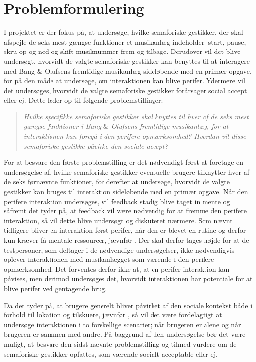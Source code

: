 \section{Problemformulering}
\label{Problemformulering}
%
I projektet er der fokus på, at undersøge, hvilke semaforiske gestikker, der skal afspejle de seks mest gængse funktioner et musikanlæg indeholder; start, pause, skru op og ned og skift musiknummer frem og tilbage. Derudover vil det blive undersøgt, hvorvidt de valgte semaforiske gestikker kan benyttes til at interagere med Bang $\&$ Olufsens fremtidige musikanlæg sideløbende med en primær opgave, for på den måde at undersøge, om interaktionen kan blive perifer. Ydermere vil det undersøges, hvorvidt de valgte semaforiske gestikker forårsager social accept eller ej. Dette leder op til følgende problemstillinger:\blankline
%
\begin{quotation}
	\noindent
	\textit{Hvilke specifikke semaforiske gestikker skal knyttes til hver af de seks mest gængse funktioner i Bang $\&$ Olufsens fremtidige musikanlæg, for at interaktionen kan foregå i den perifere opmærksomhed?\blankline
		Hvordan vil disse semaforiske gestikke påvirke den sociale accept?}\blankline
\end{quotation}
%
For at besvare den første problemstilling er det nødvendigt først at foretage en undersøgelse af, hvilke semaforiske gestikker eventuelle brugere tilknytter hver af de seks førnævnte funktioner, for derefter at undersøge, hvorvidt de valgte gestikker kan bruges til interaktion sideløbende med en primær opgave. Når den perifere interaktion undersøges, vil feedback stadig blive taget in mente og såfremt det tyder på, at feedback vil være nødvendig for at fremme den perifere interaktion, så vil dette blive undersøgt og diskuteret nærmere. Som nævnt tidligere bliver en interaktion først perifer, når den er blevet en rutine og derfor kun kræver få mentale ressourcer, jævnfør . Der skal derfor tages højde for at de testpersoner, som deltager i de nødvendige undersøgelser, ikke nødvendigvis oplever interaktionen med musikanlægget som værende i den perifere opmærksomhed. Det forventes derfor ikke at, at en perifer interaktion kan påvises, men derimod undersøges det, hvorvidt interaktionen har potentiale for at blive perifer ved gentagende brug. 

Da det tyder på, at brugere generelt bliver påvirket af den sociale kontekst både i forhold til lokation og tilskuere, jævnfør , så vil det være fordelagtigt at undersøge interaktionen i to forskellige scenarier; når brugeren er alene og når brugeren er sammen med andre. På baggrund af den undersøgelse bør det være muligt, at besvare den sidst nævnte problemstilling og tilmed vurdere om de semaforiske gestikker opfattes, som værende socialt acceptable eller ej. 




